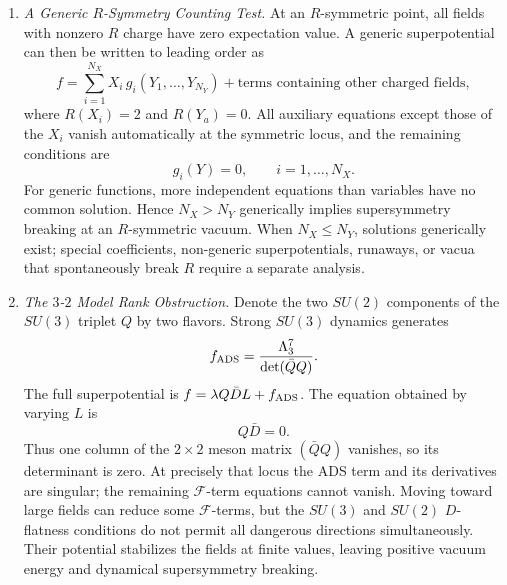 \begin{enumerate}
  \begin{enumerate}
    \item \emph{A Generic \(R\)-Symmetry Counting Test.}
    At an \(R\)-symmetric point, all fields with nonzero \(R\) charge have
      zero expectation value.  A generic superpotential can then be written
      to leading order as
      \[
        f=\sum_{i=1}^{N_X}X_i\,g_i(Y_1,\ldots,Y_{N_Y})
          +\text{terms containing other charged fields},
      \]
      where \(R(X_i)=2\) and \(R(Y_a)=0\).  All auxiliary equations except
      those of the \(X_i\) vanish automatically at the symmetric locus, and
      the remaining conditions are
      \[
        g_i(Y)=0,\qquad i=1,\ldots,N_X.
      \]
      For generic functions, more independent equations than variables
      have no common solution.  Hence \(N_X>N_Y\) generically implies
      supersymmetry breaking at an \(R\)-symmetric vacuum.  When
      \(N_X\leq N_Y\), solutions generically exist; special coefficients,
      non-generic superpotentials, runaways, or vacua that spontaneously
      break \(R\) require a separate analysis.
    \item \emph{The \(3\)-\(2\) Model Rank Obstruction.}
    Denote the two \(SU(2)\) components of the \(SU(3)\) triplet \(Q\) by
      two flavors.  Strong \(SU(3)\) dynamics generates
      \[
        f_{\rm ADS}
          =\frac{\Lambda_3^7}
           {\det(\bar Q Q)}.
      \]
      The full superpotential is
      \(f=\lambda Q\bar D L+f_{\rm ADS}\).  The equation obtained by varying
      \(L\) is
      \[
        Q\bar D=0.
      \]
      Thus one column of the \(2\times2\) meson matrix
      \((\bar Q Q)\) vanishes, so its determinant is zero.  At precisely
      that locus the ADS term and its derivatives are singular; the
      remaining \(\mathcal F\)-term equations cannot vanish.  Moving toward
      large fields can reduce some \(\mathcal F\)-terms, but the
      \(SU(3)\) and \(SU(2)\) \(D\)-flatness conditions do not permit all
      dangerous directions simultaneously.  Their potential stabilizes the
      fields at finite values, leaving positive vacuum energy and dynamical
      supersymmetry breaking.
  \end{enumerate}


\end{enumerate}
